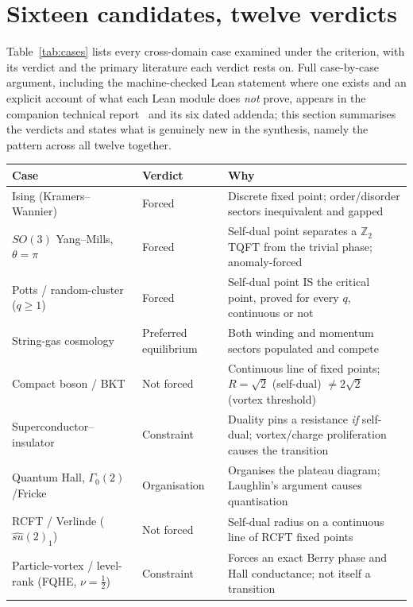 \documentclass[11pt,a4paper]{article}
\begin{document}
\section{Sixteen candidates, twelve verdicts}

Table~\ref{tab:cases} lists every cross-domain case examined under the criterion, with its verdict and
the primary literature each verdict rests on. Full case-by-case argument, including the machine-checked
Lean statement where one exists and an explicit account of what each Lean module does \emph{not} prove,
appears in the companion technical report~\cite{Callens2026Duality} and its six dated addenda; this
section summarises the verdicts and states what is genuinely new in the synthesis, namely the pattern
across all twelve together.

\begin{table}[h]
\centering
\small
\begin{tabular}{@{}p{3.6cm}p{2.6cm}p{5.7cm}@{}}
\toprule
\textbf{Case} & \textbf{Verdict} & \textbf{Why} \\
\midrule
Ising (Kramers--Wannier) & Forced & Discrete fixed point; order/disorder sectors inequivalent and gapped \\
$SO(3)$ Yang--Mills, $\theta=\pi$ & Forced & Self-dual point separates a $\mathbb Z_2$ TQFT from the trivial phase; anomaly-forced~\cite{KaidiOhmoriZheng2022} \\
Potts / random-cluster ($q\geq1$) & Forced & Self-dual point IS the critical point, proved for every $q$, continuous or not~\cite{BeffaraDuminilCopin2012} \\
String-gas cosmology & Preferred equilibrium & Both winding and momentum sectors populated and compete~\cite{BrandenbergerVafa1989} \\
Compact boson / BKT & Not forced & Continuous line of fixed points; $R=\sqrt2$ (self-dual) $\neq2\sqrt2$ (vortex threshold) \\
Superconductor--insulator & Constraint & Duality pins a resistance \emph{if} self-dual; vortex/charge proliferation causes the transition~\cite{Fisher1990} \\
Quantum Hall, $\Gamma_0(2)$/Fricke & Organisation & Organises the plateau diagram; Laughlin's argument causes quantisation~\cite{LutkenRoss1992,Laughlin1981} \\
RCFT / Verlinde ($\widehat{su}(2)_1$) & Not forced & Self-dual radius on a continuous line of RCFT fixed points~\cite{PaceChatterjeeShao2024} \\
Particle-vortex / level-rank (FQHE, $\nu=\tfrac12$) & Constraint & Forces an exact Berry phase and Hall conductance; not itself a transition~\cite{Son2015} \\

\end{tabular}
\end{table}
\end{document}
